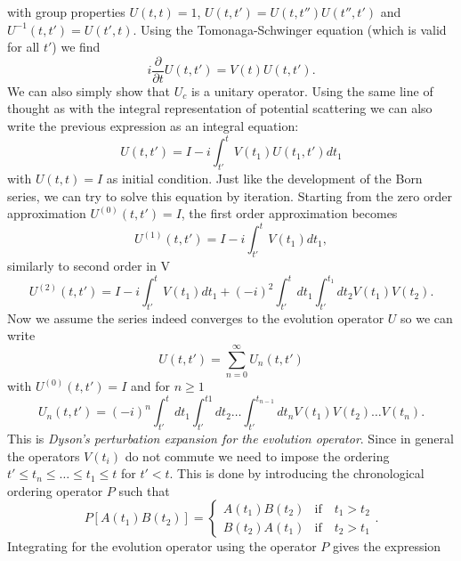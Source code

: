 \documentclass[11pt]{article}
\numberwithin{equation}{section}
\begin{document}
with group properties $U(t,t) = 1$, $U(t,t') = U(t,t'')U(t'',t')$ and $U^{-1}(t,t') = U(t',t)$. Using the Tomonaga-Schwinger equation (which is valid for all $t'$) we find
\begin{equation}
	i \frac{\partial}{\partial t} U(t,t') = V(t)U(t,t').
\end{equation}
We can also simply show that $U_c$ is a unitary operator.
Using the same line of thought as with the integral representation of potential scattering we can also write the previous expression as an integral equation:
 \begin{equation}\label{evolutionintegral}
 	U(t,t') = I - i \int^t_{t'} V(t_1)U(t_1,t')dt_1
 \end{equation}
 with $U(t,t) = I$ as initial condition. Just like the development of the Born series, we can try to solve this equation by iteration. Starting from the zero order approximation $U^{(0)} (t,t') = I$, the first order approximation becomes
 \begin{equation}
 	U^{(1)}(t,t') = I - i\int^t_{t'} V(t_1)dt_1,
 \end{equation}
similarly to second order in V
\begin{equation}
	U^{(2)}(t,t') = I - i\int^t_{t'} V(t_1)dt_1 + (-i)^2\int^t_{t'}dt_1\int^{t_1}_{t'}dt_2 V(t_1)V(t_2).
\end{equation}
Now we assume the series indeed converges to the evolution operator $U$ so we can write
\begin{equation}
	U(t,t') = \underset{n=0}{\overset{\infty}{\sum}} U_n (t,t')
\end{equation}
with $U^{(0)} (t,t') = I$ and for $n \geq 1$
\begin{equation}
	U_n(t,t') = (-i)^n\int_{t'}^t dt_1 \int_{t'}^{t1}dt_2 \ldots \int_{t'}^{t_{n-1}}dt_n V(t_1) V(t_2) \ldots V(t_n). 
\end{equation}
This is \emph{Dyson's perturbation expansion for the evolution operator}. Since in general the operators $V(t_i)$ do not commute we need to impose the ordering $t' \leq t_n \leq \ldots \leq t_1 \leq t$ for $t'<t$. This is done by introducing the chronological ordering operator $P$ such that
\begin{equation}
	P[A(t_1)B(t_2)] = \begin{cases} A(t_1)B(t_2) &\mbox{if} \quad t_1 > t_2\\ B(t_2)A(t_1) &\mbox{if} \quad t_2 > t_1 \end{cases}.
\end{equation}
Integrating for the evolution operator using the operator $P$ gives the expression 
\end{document}
